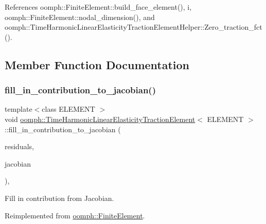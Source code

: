 References oomph\+::\+Finite\+Element\+::build\+\_\+face\+\_\+element(), i, oomph\+::\+Finite\+Element\+::nodal\+\_\+dimension(), and oomph\+::\+Time\+Harmonic\+Linear\+Elasticity\+Traction\+Element\+Helper\+::\+Zero\+\_\+traction\+\_\+fct().



\subsection{Member Function Documentation}
\mbox{\label{classoomph_1_1TimeHarmonicLinearElasticityTractionElement_abe56c5d06398dd108308b8105cb24de9}} 
\subsubsection{\texorpdfstring{fill\+\_\+in\+\_\+contribution\+\_\+to\+\_\+jacobian()}{fill\_in\_contribution\_to\_jacobian()}}
{\footnotesize\ttfamily template$<$class E\+L\+E\+M\+E\+NT $>$ \\
void \hyperlink{classoomph_1_1TimeHarmonicLinearElasticityTractionElement}{oomph\+::\+Time\+Harmonic\+Linear\+Elasticity\+Traction\+Element}$<$ E\+L\+E\+M\+E\+NT $>$\+::fill\+\_\+in\+\_\+contribution\+\_\+to\+\_\+jacobian (\begin{DoxyParamCaption}\item[{\hyperlink{classoomph_1_1Vector}{Vector}$<$ double $>$ \&}]{residuals,  }\item[{\hyperlink{classoomph_1_1DenseMatrix}{Dense\+Matrix}$<$ double $>$ \&}]{jacobian }\end{DoxyParamCaption})\hspace{0.3cm}{\ttfamily [inline]}, {\ttfamily [virtual]}}



Fill in contribution from Jacobian. 



Reimplemented from \hyperlink{classoomph_1_1FiniteElement_a0ae7af222af38a0d53bf283dc85bdfea}{oomph\+::\+Finite\+Element}.



